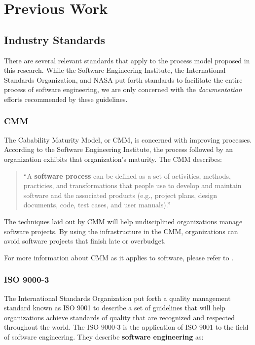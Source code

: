 \section{Previous Work}

\subsection{Industry Standards}
There are several relevant standards that apply to the process model proposed in
this research. While the Software Engineering Institute, the International
Standards Organization, and NASA put forth standards to facilitate the entire
process of software engineering, we are only concerned with the 
\textit{documentation} efforts recommended by these guidelines.

\subsubsection{CMM}
The Cabability Maturity Model, or CMM, is concerned with improving processes.
According to the Software Engineering Institute, the process followed by an
organization exhibits that organization's maturity. The CMM describes:

\begin{quote}\label{process}
``A \textbf{software process} can be defined as a set of activities, methods,
practicies, and transformations that people use to develop and maintain software
and the associated products (e.g., project plans, design documents, code, test
cases, and user manuals).'' \cite{CMM11}
\end{quote}

The techniques laid out by CMM will help undisciplined organizations manage
software projects. By using the infrastructure in the CMM, organizations can 
avoid software projects that finish late or overbudget.

For more information about CMM as it applies to software, please refer to
\cite{CMM11}.

\subsubsection{ISO 9000-3}
The International Standards Organization put forth a quality management standard
known as ISO 9001 to describe a set of guidelines that will help organizations
achieve standards of quality that are recognized and respected throughout the
world. The ISO 9000-3 is the application of ISO 9001 to the field of software
engineering. They describe \textbf{software engineering} as: 

